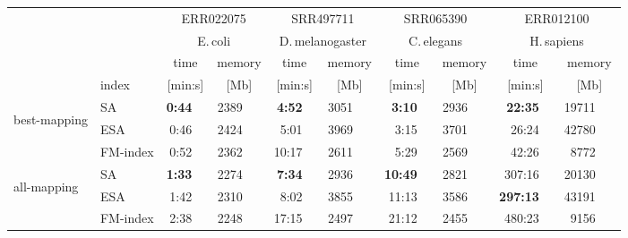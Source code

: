 \begin{tabular}{llrrrrrrrr}
  \toprule
  & \multirow{2}{*}{}  &\multicolumn{ 2 }{c}{  ERR022075 } &\multicolumn{ 2 }{c}{  SRR497711 } &\multicolumn{ 2 }{c}{  SRR065390 } &\multicolumn{ 2 }{c}{  ERR012100 } \\
  &&\multicolumn{2}{c}{E.\,coli}&\multicolumn{2}{c}{D.\,melanogaster}&\multicolumn{2}{c}{C.\,elegans}&\multicolumn{2}{c}{H.\,sapiens} \\
  \cmidrule(lr){3-4}\cmidrule(lr){5-6}\cmidrule(lr){7-8}\cmidrule(lr){9-10} 
  &  &\multicolumn{1}{c}{  time } &\multicolumn{1}{c}{  memory } &\multicolumn{1}{c}{  time } &\multicolumn{1}{c}{  memory } &\multicolumn{1}{c}{  time } &\multicolumn{1}{c}{  memory } &\multicolumn{1}{c}{  time } &\multicolumn{1}{c}{  memory } \\
  & index  &\multicolumn{1}{c}{  [min:s] } &\multicolumn{1}{c}{  [Mb] } &\multicolumn{1}{c}{  [min:s] } &\multicolumn{1}{c}{  [Mb] } &\multicolumn{1}{c}{  [min:s] } &\multicolumn{1}{c}{  [Mb] } &\multicolumn{1}{c}{  [min:s] } &\multicolumn{1}{c}{  [Mb] } \\
  \midrule
\multirow{3}{*}{\begin{sideways}\tiny best-mapping\hspace{0.8ex} \end{sideways}} &  SA  & \phantom{000}\textbf{0:44}\ \  & 2389\ \ \  & \phantom{000}\textbf{4:52}\ \  & 3051\ \ \  & \phantom{000}\textbf{3:10}\ \  & 2936\ \ \  & \phantom{00}\textbf{22:35}\ \  & 19711\ \ \  \\ 
    &  ESA  & \phantom{000}0:46\ \  & 2424\ \ \  & \phantom{000}5:01\ \  & 3969\ \ \  & \phantom{000}3:15\ \  & 3701\ \ \  & \phantom{00}26:24\ \  & 42780\ \ \  \\ 
     &  FM-index  & \phantom{000}0:52\ \  & 2362\ \ \  & \phantom{00}10:17\ \  & 2611\ \ \  & \phantom{000}5:29\ \  & 2569\ \ \  & \phantom{00}42:26\ \  & 8772\ \ \  \\ 
  \midrule\multirow{3}{*}{\begin{sideways}\tiny all-mapping\hspace{1.4ex} \end{sideways}} &  SA   & \phantom{000}\textbf{1:33}\ \  & 2274\ \ \  & \phantom{000}\textbf{7:34}\ \  & 2936\ \ \  & \phantom{00}\textbf{10:49}\ \  & 2821\ \ \  & \phantom{0}307:16\ \  & 20130\ \ \  \\ 
      &  ESA   & \phantom{000}1:42\ \  & 2310\ \ \  & \phantom{000}8:02\ \  & 3855\ \ \  & \phantom{00}11:13\ \  & 3586\ \ \  & \phantom{0}\textbf{297:13}\ \  & 43191\ \ \  \\ 
       &  FM-index   & \phantom{000}2:38\ \  & 2248\ \ \  & \phantom{00}17:15\ \  & 2497\ \ \  & \phantom{00}21:12\ \  & 2455\ \ \  & \phantom{0}480:23\ \  & 9156\ \ \  \\ 
   \bottomrule
\end{tabular}
